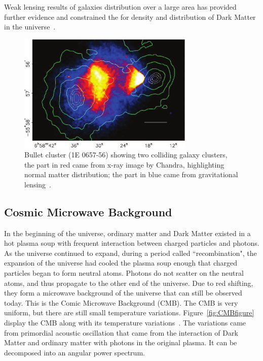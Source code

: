     Weak lensing results of galaxies distribution over a large area has provided further evidence and constrained the for density and distribution of Dark Matter in the universe~\cite{wittman2000detection}.


\begin{figure}[!htb]
    \begin{center}
        \includegraphics[width=0.75\textwidth]{figures/chapter_DM/BulletCluster}
        \caption{
			Bullet cluster (1E 0657-56) showing two colliding galaxy clusters, the part in red came from x-ray image by Chandra, highlighting normal matter distribution; the part in blue came from gravitational lensing~\cite{BulletCluster}.
        }
        \label{fig:BulletCluster_figure}
    \end{center}
\end{figure}

\subsection{Cosmic Microwave Background}
\label{sec:CMB}
In the beginning of the universe, ordinary matter and Dark Matter existed in a hot plasma soup with frequent interaction between charged particles and photons. As the universe continued to expand, during a period called ``recombination", the expansion of the universe had cooled the plasma soup enough that charged particles began to form neutral atoms. Photons do not scatter on the neutral atoms, and thus propagate to the other end of the universe. Due to red shifting, they form a microwave
background of the universe that can still be observed today. This is the Comic Microwave Background (CMB). The CMB is very uniform, but there are still small temperature variations. Figure~\ref{fig:CMBfigure} display the CMB along with its temperature variations~\cite{fixsen2009temperature}. The variations came from primordial acoustic oscillation that came from the interaction of Dark Matter and ordinary matter with photons in the original plasma. It can be decomposed into an angular power spectrum.

